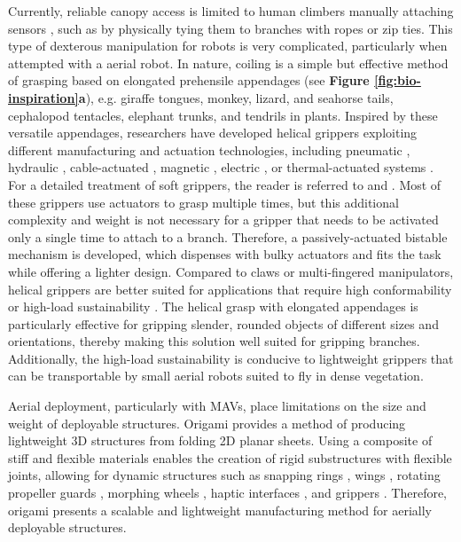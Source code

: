 Currently, reliable canopy access is limited to human climbers manually attaching sensors \cite{Anderson2020a, Didham2014, Cannon2021}, such as by physically tying them to branches with ropes or zip ties. This type of dexterous manipulation for robots is very complicated, particularly when attempted with a aerial robot. In nature, coiling is a simple but effective method of grasping based on elongated prehensile appendages (see \textbf{Figure \ref{fig:bio-inspiration}a}), e.g. giraffe tongues, monkey, lizard, and seahorse tails, cephalopod tentacles, elephant trunks, and tendrils in plants. Inspired by these versatile appendages, researchers have developed helical grippers exploiting different manufacturing and actuation technologies, including pneumatic \mbox{\cite{Kumar2018, Hu2020, Pal2020}}, hydraulic \cite{Galloway2016, Hoang2020a}, cable-actuated \mbox{\cite{Mazzolai2019}}, magnetic \mbox{\cite{Wu2021a}}, electric \mbox{\cite{Meder2022}}, \mbox{\cite{Shao2018}} or thermal-actuated systems \mbox{\cite{Wang2018}}. For a detailed treatment of soft grippers, the reader is referred to \mbox{\cite{Shintake2018}} and \mbox{\cite{Chi2022}}. Most of these grippers use actuators to grasp multiple times, but this additional complexity and weight is not necessary for a gripper that needs to be activated only a single time to attach to a branch. Therefore, a passively-actuated bistable mechanism is developed, which dispenses with bulky actuators and fits the task while offering a lighter design. Compared to claws or multi-fingered manipulators, helical grippers are better suited for applications that require high conformability or high-load sustainability \cite{Hoang2020a}. The helical grasp with elongated appendages is particularly effective for gripping slender, rounded objects of different sizes and orientations, thereby making this solution well suited for gripping branches. Additionally, the high-load sustainability is conducive to lightweight grippers that can be transportable by small aerial robots suited to fly in dense vegetation.

Aerial deployment, particularly with MAVs, place limitations on the size and weight of deployable structures. Origami provides a method of producing lightweight 3D structures from folding 2D planar sheets. Using a composite of stiff and flexible materials enables the creation of rigid substructures with flexible joints, allowing for dynamic structures such as snapping rings \cite{Wu2021}, wings \cite{Baek2020}, rotating propeller guards \cite{Sareh2018}, morphing wheels \cite{Lee2021}, haptic interfaces \cite{Mintchev2019}, and grippers \cite{Li2019d, Mintchev2018, Faber2018a, Firouzeh2017a, Boyvat2017, Kim2018c}. Therefore, origami presents a scalable and lightweight manufacturing method for aerially deployable structures.

